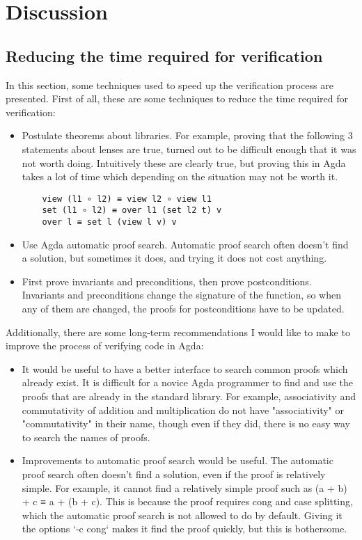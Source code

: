 \section{Discussion}
\subsection{Reducing the time required for verification}
In this section, some techniques used to speed up the verification process are presented. First of all, these are some techniques to reduce the time required for verification:
\begin{itemize}
    \item Postulate theorems about libraries. For example, proving that the following 3 statements about lenses are true, turned out to be difficult enough that it was not worth doing. Intuitively these are clearly true, but proving this in Agda takes a lot of time which depending on the situation may not be worth it. 
    \begin{verbatim}
    view (l1 ∘ l2) ≡ view l2 ∘ view l1
    set (l1 ∘ l2) ≡ over l1 (set l2 t) v
    over l ≡ set l (view l v) v
    \end{verbatim}
    \item Use Agda automatic proof search. Automatic proof search often doesn't find a solution, but sometimes it does, and trying it does not cost anything.
    \item First prove invariants and preconditions, then prove postconditions. Invariants and preconditions change the signature of the function, so when any of them are changed, the proofs for postconditions have to be updated.
\end{itemize}

Additionally, there are some long-term recommendations I would like to make to improve the process of verifying code in Agda:
\begin{itemize}
    \item It would be useful to have a better interface to search common proofs which already exist. It is difficult for a novice Agda programmer to find and use the proofs that are already in the standard library. For example, associativity and commutativity of addition and multiplication do not have "associativity" or "commutativity" in their name, though even if they did, there is no easy way to search the names of proofs.
    \item Improvements to automatic proof search would be useful. The automatic proof search often doesn't find a solution, even if the proof is relatively simple. For example, it cannot find a relatively simple proof such as (a + b) + c ≡ a + (b + c). This is because the proof requires cong and case splitting, which the automatic proof search is not allowed to do by default. Giving it the options `-c cong` makes it find the proof quickly, but this is bothersome.
\end{itemize}